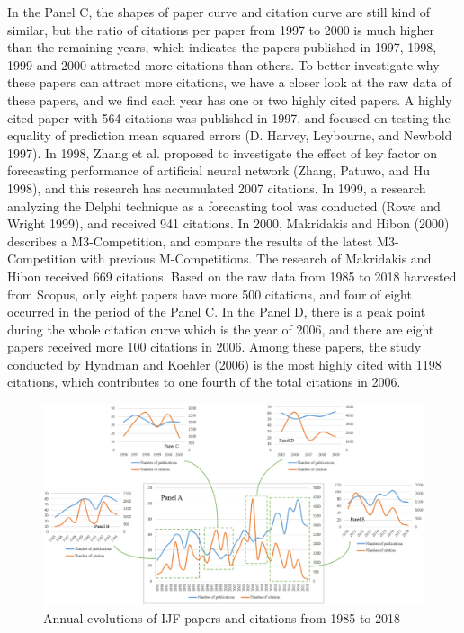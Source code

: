 \documentclass[11pt,a4paper]{elsarticle} %
\begin{document}
In the Panel C, the shapes of paper curve and citation curve are still
kind of similar, but the ratio of citations per paper from 1997 to 2000
is much higher than the remaining years, which indicates the papers
published in 1997, 1998, 1999 and 2000 attracted more citations than
others. To better investigate why these papers can attract more
citations, we have a closer look at the raw data of these papers, and we
find each year has one or two highly cited papers. A highly cited paper
with 564 citations was published in 1997, and focused on testing the
equality of prediction mean squared errors (D. Harvey, Leybourne, and
Newbold 1997). In 1998, Zhang et al. proposed to investigate the effect
of key factor on forecasting performance of artificial neural network
(Zhang, Patuwo, and Hu 1998), and this research has accumulated 2007
citations. In 1999, a research analyzing the Delphi technique as a
forecasting tool was conducted (Rowe and Wright 1999), and received 941
citations. In 2000, Makridakis and Hibon (2000) describes a
M3-Competition, and compare the results of the latest M3-Competition
with previous M-Competitions. The research of Makridakis and Hibon
received 669 citations. Based on the raw data from 1985 to 2018
harvested from Scopus, only eight papers have more 500 citations, and
four of eight occurred in the period of the Panel C. In the Panel D,
there is a peak point during the whole citation curve which is the year
of 2006, and there are eight papers received more 100 citations in 2006.
Among these papers, the study conducted by Hyndman and Koehler (2006) is
the most highly cited with 1198 citations, which contributes to one
fourth of the total citations in 2006.

\begin{figure}[htbp]
\centering
\includegraphics[scale=0.4]{fig.1.eps}
\caption{Annual evolutions of IJF papers and citations from 1985 to 2018}
\end{figure}\newpage
\end{document}
